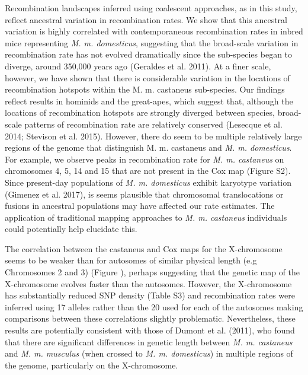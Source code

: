 Recombination landscapes inferred using coalescent approaches, as in this study, reflect ancestral variation in recombination rates. We show that this ancestral variation is highly correlated with contemporaneous recombination rates in inbred mice representing \emph{M. m. domesticus}, suggesting that the broad-scale variation in recombination rate has not evolved dramatically since the sub-species began to diverge, around 350,000 years ago (Geraldes et al. 2011). At a finer scale, however, we have shown that there is considerable variation in the locations of recombination hotspots within the M. m. castaneus sub-species. Our findings reflect results in hominids and the great-apes, which suggest that, although the locations of recombination hotspots are strongly diverged between species, broad-scale patterns of recombination rate are relatively conserved (Lesecque et al. 2014; Stevison et al. 2015). However, there do seem to be multiple relatively large regions of the genome that distinguish M. m. castaneus and \emph{M. m. domesticus}. For example, we observe peaks in recombination rate for \emph{M. m. castaneus} on chromosomes 4, 5, 14 and 15 that are not present in the Cox map (Figure S2). Since present-day populations of \emph{M. m. domesticus} exhibit karyotype variation (Gimenez et al. 2017), is seems plausible that chromosomal translocations or fusions in ancestral populations may have affected our rate estimates. The application of traditional mapping approaches to \emph{M. m. castaneus} individuals could potentially help elucidate this.

The correlation between the castaneus and Cox maps for the X-chromosome seems to be weaker than for autosomes of similar physical length (e.g Chromosomes 2 and 3) (Figure ), perhaps suggesting that the genetic map of the X-chromosome evolves faster than the autosomes. However, the X-chromosome has substantially reduced SNP density (Table S3) and recombination rates were inferred using 17 alleles rather than the 20 used for each of the autosomes making comparisons between these correlations slightly problematic. Nevertheless, these results are potentially consistent with those of Dumont et al. (2011), who found that there are significant differences in genetic length between \emph{M. m. castaneus} and \emph{M. m. musculus} (when crossed to \emph{M. m. domesticus}) in multiple regions of the genome, particularly on the X-chromosome.

